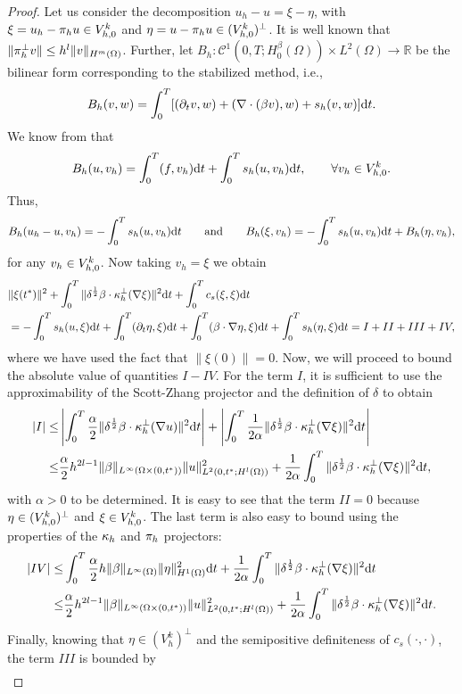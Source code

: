 \begin{proof}
Let us consider the decomposition $u_h - u = \xi - \eta$, with $\xi = u_h - \pi_{h}{u} \in V^k_{h,0}$ and $\eta = u - \pi_{h}{u}  \in (V^k_{h,0})^\perp$. It is well known that $\| \pi_{h}^\perp{v}\| \leq h^l \| v \|_{H^m(\Omega)}$. Further, let $B_h:\mathcal{C}^1(0,T;H_0^\beta(\Omega))\times L^2(\Omega) \longrightarrow \mathbb{R}$ be the bilinear form corresponding to the stabilized method, i.e., 
$$B_h(v,w) = \displaystyle\int_0^T [(\partial_t v,w) +   (\nabla \cdot (\beta v),w) + s_h(v,w)] {\rm d}t.$$ 
We know from  that 
$$B_h(u,v_h) =\displaystyle\int_0^T (f,v_h) {\rm d}t + \displaystyle\int_0^T s_h(u,v_h) {\rm d}t,\qquad \forall v_h\in V^k_{h,0}.$$
Thus,  
$$B_h(u_h-u,v_h) = -\displaystyle\int_0^T  s_h(u,v_h) {\rm d}t \qquad \hbox{and} \qquad B_h(\xi,v_h) =- \displaystyle\int_0^T  s_h(u,v_h) {\rm d}t + B_h(\eta,v_h),$$ 
for any $v_h\in V^k_{h,0}$. Now taking $v_h = \xi$ we obtain
\begin{align*}
& \|\xi(t^*)\|^2  + \displaystyle\int_0^T \| \delta^\frac{1}{2} \beta \cdot \kappa_h^\perp (\nabla \xi) \|^2  {\rm d}t  +\displaystyle\int_0^T c_s(\xi,\xi) {\rm d}t \nonumber \\ &=  - \displaystyle\int_0^T s_h(u,\xi) {\rm d}t + \displaystyle\int_0^T (\partial_t \eta, \xi) {\rm d}t + \displaystyle\int_0^T (\beta\cdot \nabla \eta,\xi) {\rm d}t + \displaystyle\int_0^T s_h(\eta,\xi) {\rm d}t  =  I + II + III + IV,
\end{align*}
where we have used the fact that $\|\xi(0)\| = 0$. Now, we will proceed to bound the absolute value of quantities $I-IV$. For the term $I$, it is sufficient to use the approximability of the Scott-Zhang projector and the definition of $\delta$ to obtain
\begin{align*}
|I| \leq & \left| \displaystyle\int_0^T \frac{\alpha}{2} \| \delta^\frac{1}{2} \beta \cdot \kappa_h^\perp (\nabla u) \|^2 {\rm d}t\right| + 
 \left| \displaystyle\int_0^T \frac{1}{2\alpha} \| \delta^\frac{1}{2} \beta \cdot \kappa_h^\perp (\nabla \xi) \|^2 {\rm d}t \right| \\
 \leq & \frac{\alpha}{2} h^{2l-1} \|\beta\|_{L^\infty(\Omega \times (0,t^*))} \|u\|^2_{L^2(0,t^*;H^l(\Omega))} + \frac{1}{2\alpha} \displaystyle\int_0^T \| \delta^\frac{1}{2} \beta \cdot \kappa_h^\perp (\nabla \xi) \|^2  {\rm d}t,
\end{align*}
with $\alpha >0 $ to be determined. It is easy to see that the term $II=0$ because $\eta\in (V^k_{h,0})^\perp$ and $\xi\in V^k_{h,0}$. The last term is also easy to bound using the properties of the $\kappa_h$ and $\pi_{h}$ projectors:
\begin{align*}
|IV| \leq & \displaystyle\int_0^T \frac{\alpha}{2} h \|\beta\|_{L^\infty(\Omega)} \|\eta\|^2_{H^1(\Omega)}  {\rm d}t +  \frac{1}{2\alpha} \displaystyle\int_0^T \| \delta^\frac{1}{2} \beta \cdot \kappa_h^\perp (\nabla \xi) \|^2  {\rm d}t\\
\leq & \frac{\alpha}{2} h^{2l-1} \|\beta\|_{L^\infty(\Omega \times (0,t^*))}  \|u\|^2_{L^2(0,t^*;H^l(\Omega))} + \frac{1}{2\alpha} \displaystyle\int_0^T \| \delta^\frac{1}{2} \beta \cdot \kappa_h^\perp (\nabla \xi) \|^2  {\rm d}t.
\end{align*}
Finally, knowing that $\eta \in (V^k_h)^\perp$ and the semipositive definiteness of $c_s(\cdot,\cdot)$, the term $III$ is bounded by
\begin{align*}

\end{align*}
\end{proof}
